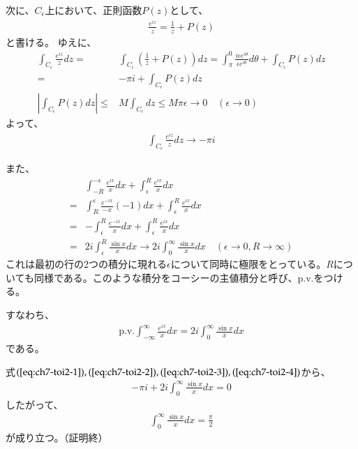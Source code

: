次に、$C_\epsilon$上において、正則函数$P(z)$として、
\begin{align*}
    \frac{e^{iz}}{z}=\frac{1}{z}+P(z)
\end{align*}
と書ける。
ゆえに、
\begin{align*}
    \int_{C_\epsilon}\frac{e^{iz}}{z}dz
    =&\int_{C_\epsilon}\left(\frac{1}{z}+P(z)\right)dz
    =\int_{\pi}^{0}\frac{i\epsilon e^{i\theta}}{\epsilon e^{i\theta}}d\theta+\int_{C_\epsilon}P(z)dz\\
    =&-\pi i+\int_{C_\epsilon}P(z)dz\\
    \left|\int_{C_\epsilon}P(z)dz\right|
    \le&M\int_{C_\epsilon}dz
    \le M\pi\epsilon\longrightarrow0
    \quad(\epsilon\longrightarrow0)
\end{align*}
よって、
\begin{align}
    \int_{C_\epsilon}\frac{e^{iz}}{z}dz
    \longrightarrow-\pi i\label{eq:ch7-toi2-3}
\end{align}

また、
\begin{align*}
    &\int_{-R}^{-\epsilon}\frac{e^{ix}}{x}dx+\int_{\epsilon}^{R}\frac{e^{ix}}{x}dx\\
    =&\int_{R}^{\epsilon}\frac{e^{-ix}}{-x}(-1)dx+\int_{\epsilon}^{R}\frac{e^{ix}}{x}dx\\
    =&-\int_{\epsilon}^{R}\frac{e^{-ix}}{x}dx+\int_{\epsilon}^{R}\frac{e^{ix}}{x}dx\\
    =&2i\int_{\epsilon}^{R}\frac{\sin x}{x}dx
    \longrightarrow
    2i\int_{0}^{\infty}\frac{\sin x}{x}dx
    \quad(\epsilon\longrightarrow0,R\longrightarrow\infty)
\end{align*}
これは最初の行の2つの積分に現れる$\epsilon$について同時に極限をとっている。$R$についても同様である。このような積分をコーシーの主値積分と呼び、$\mathrm{p.v.}$をつける。

すなわち、
\begin{align}
    \mathrm{p.v.}\int_{-\infty}^{\infty}\frac{e^{ix}}{x}dx=2i\int_{0}^{\infty}\frac{\sin x}{x}dx\label{eq:ch7-toi2-4}
\end{align}
である。

式$(\ref{eq:ch7-toi2-1}),(\ref{eq:ch7-toi2-2}),(\ref{eq:ch7-toi2-3}),(\ref{eq:ch7-toi2-4})$から、
\begin{align*}
    -\pi i+2i\int_{0}^{\infty}\frac{\sin x}{x}dx=0
\end{align*}
したがって、
\begin{align*}
    \int_{0}^{\infty}\frac{\sin x}{x}dx
    =\frac{\pi}{2}
\end{align*}
が成り立つ。（証明終）